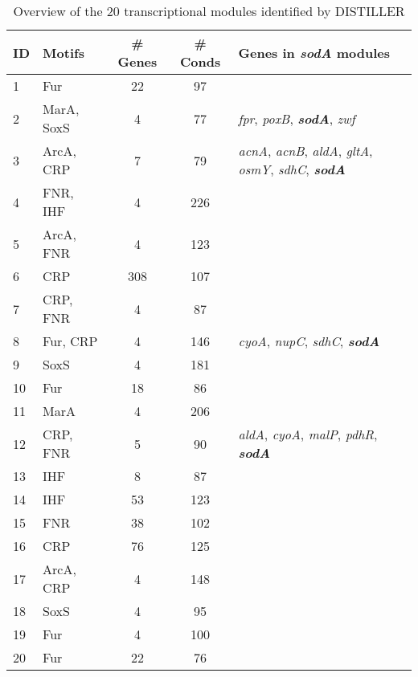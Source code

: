 \begin{table}[tb]
	\caption{Overview of the 20 transcriptional modules identified by DISTILLER}
	\label{tab:distModules}
	\begin{small}
	\begin{tabular}{p{5mm} p{2cm} c c p{4.5cm}}
	\toprule
	{\bf ID} & {\bf Motifs} & {\bf \# Genes} & {\bf \# Conds} & {\bf Genes in 
	\textit{sodA} modules} \\
	\midrule
	1 & Fur	& 22 & 97 & \\
	2 &	MarA, SoxS & 4 & 77	& \textit{fpr}, \textit{poxB}, 	
	\textit{\textbf{sodA}}, \textit{zwf} \\
	3 &	ArcA, CRP &	7 &	79 & \textit{acnA}, \textit{acnB}, \textit{aldA}, 
	\textit{gltA}, \textit{osmY}, \textit{sdhC}, \textit{\textbf{sodA}} \\
	4 &	FNR, IHF & 4 & 226 & \\
	5 &	ArcA, FNR &	4 &	123	& \\	
	6 &	CRP	& 308 &	107	& \\
	7 &	CRP, FNR & 4 & 87 & \\
	8 &	Fur, CRP & 4 & 146 & \textit{cyoA}, \textit{nupC}, \textit{sdhC}, 
	\textit{\textbf{sodA}} \\
	9 &	SoxS & 4 &	181	& \\
	10 & Fur & 18 & 86	& \\
	11 & MarA &	4 &	206	& \\
	12 & CRP, FNR & 5 &	90 & \textit{aldA}, \textit{cyoA}, 
	\textit{malP}, \textit{pdhR}, \textit{\textbf{sodA}} \\
	13 & IHF &	8 &	87	& \\
	14 & IHF &	53 & 123	& \\
	15 & FNR &	38 & 102	& \\
	16 & CRP &	76 & 125	& \\
	17 & ArcA, CRP &  4 &	148	& \\
	18 & SoxS &	4 &	95	& \\
	19 & Fur & 4 &	100	& \\
	20 & Fur & 22 &	76 & \\
	\bottomrule
	\end{tabular}
	\end{small}
\end{table}

